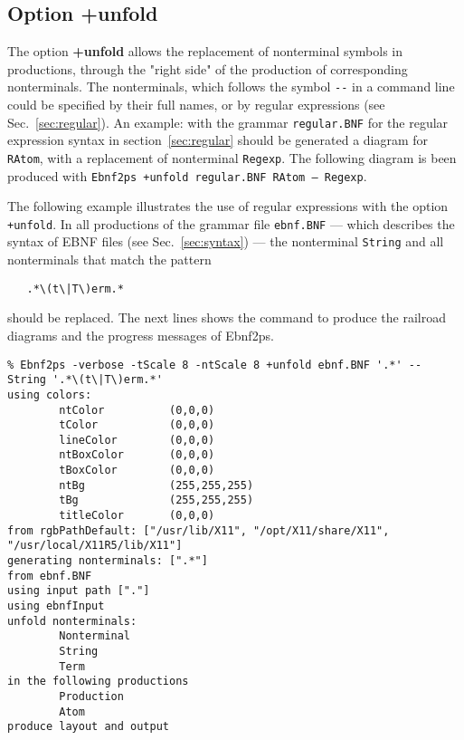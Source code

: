 \documentclass{article}
\begin{document}
\subsection{Option +unfold}
\label{sec:unfold}

The option \textbf{+unfold} allows the replacement of nonterminal
symbols in productions, through the "right side" of the production of
corresponding nonterminals. The nonterminals, which follows the symbol
\verb|--| in a command line could be specified by their full names,
or by regular expressions (see Sec.~\ref{sec:regular}). An example:
with the grammar \texttt{regular.BNF} for the regular expression
syntax in section~\ref{sec:regular} should be generated a diagram for
\texttt{RAtom}, with a replacement of nonterminal \texttt{Regexp}.
The following diagram is been produced with \texttt{Ebnf2ps +unfold
regular.BNF RAtom -- Regexp}.

\begin{flushleft}
  \leavevmode{}
\end{flushleft}

The following example illustrates the use of regular expressions with
the option \texttt{+unfold}. In all productions of the grammar file
\texttt{ebnf.BNF} --- which describes the syntax of EBNF files (see
Sec.~\ref{sec:syntax}) --- the nonterminal \texttt{String} and all
nonterminals that match the pattern
\begin{verbatim}
   .*\(t\|T\)erm.*
\end{verbatim}
\noindent should be replaced. The next lines shows the command to produce
the railroad diagrams and the progress messages of Ebnf2ps.

{\fontsize{8}{9pt}
\begin{verbatim}
% Ebnf2ps -verbose -tScale 8 -ntScale 8 +unfold ebnf.BNF '.*' -- String '.*\(t\|T\)erm.*'
using colors:
        ntColor          (0,0,0)
        tColor           (0,0,0)
        lineColor        (0,0,0)
        ntBoxColor       (0,0,0)
        tBoxColor        (0,0,0)
        ntBg             (255,255,255)
        tBg              (255,255,255)
        titleColor       (0,0,0)
from rgbPathDefault: ["/usr/lib/X11", "/opt/X11/share/X11", "/usr/local/X11R5/lib/X11"]
generating nonterminals: [".*"]
from ebnf.BNF
using input path ["."]
using ebnfInput
unfold nonterminals:
        Nonterminal
        String
        Term
in the following productions
        Production
        Atom
produce layout and output
\end{verbatim}
}
\end{document}
